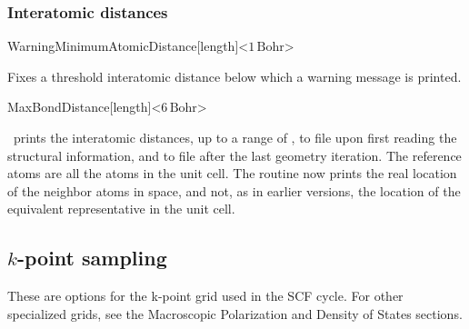 \subsubsection{Interatomic distances}

\begin{fdfentry}{WarningMinimumAtomicDistance}[length]<$1\,\mathrm{Bohr}$>

  Fixes a threshold interatomic distance below which a warning
  message is printed.

\end{fdfentry}

\begin{fdfentry}{MaxBondDistance}[length]<$6\,\mathrm{Bohr}$>

  \siesta\ prints the interatomic distances, up to a range of , to file
   upon first reading the structural information, and
  to file  after the last geometry
  iteration. The reference atoms are all the atoms in the unit
  cell. The routine now prints the real location of the neighbor atoms
  in space, and not, as in earlier versions, the location of the
  equivalent representative in the unit cell.

\end{fdfentry}



\subsection{\texorpdfstring{$k$}{k}-point sampling}

These are options for the k-point grid used in the SCF cycle. For
other specialized grids, see the Macroscopic Polarization and Density
of States sections.

